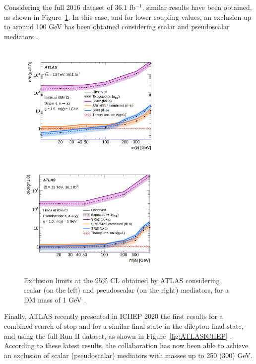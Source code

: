 \documentclass[a4paper, 10pt, openright]{report}
\begin{document}
Considering the full 2016 dataset of $36.1$ fb$^{-1}$, similar results have been obtained, as shown in Figure~\ref{fig:atlas36}. In this case, and for lower coupling values, an exclusion up to around 100 GeV has been obtained considering scalar and pseudoscalar mediators \cite{PreviousDoubleTopBottomAllLep13ATLAS}.

\begin{figure}[htbp]
\centering
\begin{minipage}[b]{.4\textwidth}
\includegraphics[width=7cm, height=6cm]{figs/Atlas36a.png}
\end{minipage}\hfill
\begin{minipage}[b]{.48\textwidth}
\includegraphics[width=7cm, height=5.88cm]{figs/Atlas36b.png}
\end{minipage}\hfill
\caption{Exclusion limits at the 95\% \ac{CL} obtained by \ac{ATLAS} considering  scalar (on the left) and pseudoscalar (on the right) mediators, for a \ac{DM} mass of 1 GeV \cite{PreviousDoubleTopBottomAllLep13ATLAS}.}\label{fig:atlas36}
\end{figure}

Finally, \ac{ATLAS} recently presented in ICHEP 2020 the first results for a combined search of stop and for a similar final state in the dilepton final state, and using the full Run II dataset, as shown in Figure~\ref{fig:ATLASICHEP} \cite{ATLASICHEP2020}. According to these latest results, the collaboration has now been able to achieve an exclusion of scalar (pseudoscalar) mediators with masses up to 250 (300) GeV.
\end{document}
